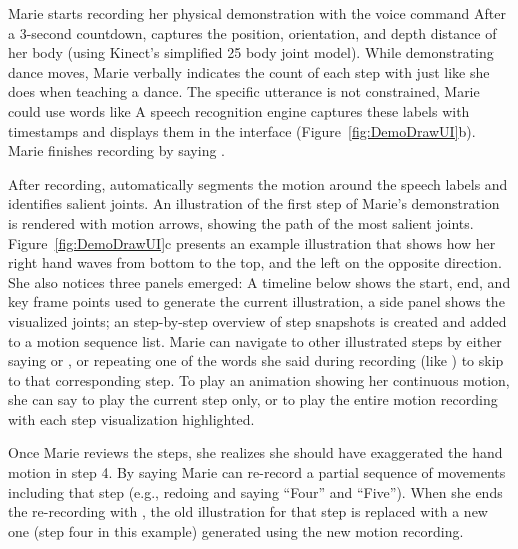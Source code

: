 Marie starts recording her physical demonstration with the voice command  After a 3-second countdown, \systemname{} captures the position, orientation, and depth distance of her body (using Kinect's simplified 25 body joint model).
%
While demonstrating dance moves, Marie verbally indicates the count of each step with  just like she does when teaching a dance. The specific utterance is not constrained, Marie could use words like  A speech recognition engine captures these labels with timestamps and displays them in the interface (Figure~\ref{fig:DemoDrawUI}b).
Marie finishes recording by saying .

After recording, \systemname{} automatically segments the motion around the speech labels and identifies salient joints. An illustration of the first step of Marie's demonstration is rendered with motion arrows, showing the path of the most salient joints. Figure~\ref{fig:DemoDrawUI}c presents an example illustration that shows how her right hand waves from bottom to the top, and the left on the opposite direction. She also notices three panels emerged: A timeline below shows the start, end, and key frame points used to generate the current illustration, a side panel shows the visualized joints; an step-by-step overview of step snapshots is created and added to a motion sequence list.
%
Marie can navigate to other illustrated steps by either saying  or , or repeating one of the words she said during recording (like ) to skip to that corresponding step. To play an animation showing her continuous motion, she can say  to play the current step only, or  to play the entire motion recording with each step visualization highlighted.

Once Marie reviews the steps, she realizes she should have exaggerated the hand motion in step 4. By saying  Marie can re-record a partial sequence of movements including that step (e.g., redoing and saying ``Four'' and ``Five'').
When she ends the re-recording with , the old illustration for that step is replaced with a new one (step four in this example) generated using the new motion recording.
%
%


